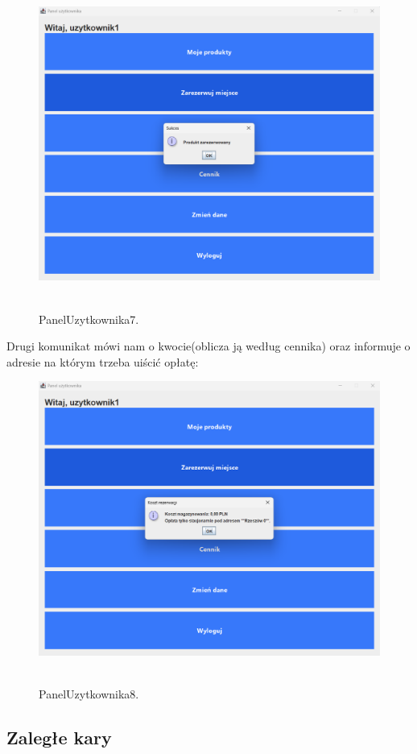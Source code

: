 \begin{figure}[H]
    \centering
    \includegraphics[width=.9\linewidth]{figures/PanelUzytkownika7.png}\
    \caption{PanelUzytkownika7.\label{PanelUzytkownika7}}
\end{figure}

Drugi komunikat mówi nam o kwocie(oblicza ją według cennika) oraz informuje o adresie na którym trzeba uiścić opłatę:

\begin{figure}[H]
    \centering
    \includegraphics[width=.9\linewidth]{figures/PanelUzytkownika8.png}\
    \caption{PanelUzytkownika8.\label{PanelUzytkownika8}}
\end{figure}

\subsection{Zaległe kary}
\label{subsec:Zaległe kary}

